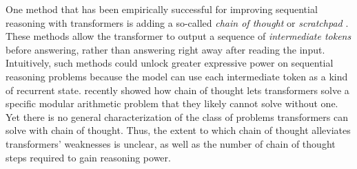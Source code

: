 \documentclass{article} %
\begin{document}
One method that has been empirically
successful for improving sequential reasoning with transformers is adding a so-called \emph{chain of thought} \citep{wei2022chain} or \emph{scratchpad} \citep{nye2022show}. These methods allow the transformer to output a sequence of \emph{intermediate tokens} before answering, rather than answering right away after reading the input. Intuitively, such methods could unlock greater expressive power on sequential reasoning problems because the model can use each intermediate token as a kind of recurrent state.
\citet{feng2023revealing} recently showed how chain of thought lets transformers solve a specific modular arithmetic problem that they likely cannot solve without one. Yet there is no general characterization of the class of problems transformers can solve with chain of thought. Thus, the extent to which chain of thought alleviates transformers' weaknesses is unclear, as well as the number of chain of thought steps required to gain reasoning power.

\end{document}
